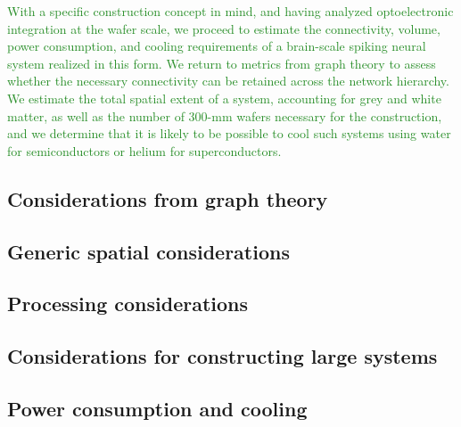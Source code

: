 \documentclass[twocolumn]{article}
\begin{document}
\textcolor{ForestGreen}{With a specific construction concept in mind, and having analyzed optoelectronic integration at the wafer scale, we proceed to estimate the connectivity, volume, power consumption, and cooling requirements of a brain-scale spiking neural system realized in this form. We return to metrics from graph theory to assess whether the necessary connectivity can be retained across the network hierarchy. We estimate the total spatial extent of a system, accounting for grey and white matter, as well as the number of 300-mm wafers necessary for the construction, and we determine that it is likely to be possible to cool such systems using water for semiconductors or helium for superconductors.}

\subsection{Considerations from graph theory}
\subsection{Generic spatial considerations}
\subsection{Processing considerations}
\subsection{Considerations for constructing large systems}
\subsection{Power consumption and cooling}
\end{document}
